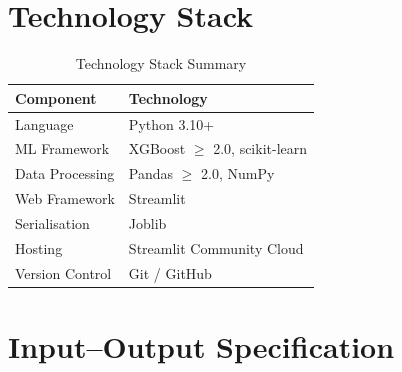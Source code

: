 \documentclass[12pt,a4paper]{article}
\begin{document}
\appendix

\section{Technology Stack}

\begin{table}[H]
\centering
\caption{Technology Stack Summary}
\begin{tabular}{@{} l l @{}}
\toprule
\textbf{Component} & \textbf{Technology} \\
\midrule
Language            & Python 3.10+                          \\
ML Framework        & XGBoost $\geq$ 2.0, scikit-learn       \\
Data Processing     & Pandas $\geq$ 2.0, NumPy              \\
Web Framework       & Streamlit                             \\
Serialisation       & Joblib                                \\
Hosting             & Streamlit Community Cloud             \\
Version Control     & Git / GitHub                          \\
\bottomrule
\end{tabular}
\end{table}

\section{Input--Output Specification}
\end{document}
